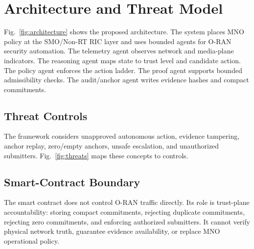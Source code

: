 \section{Architecture and Threat Model}
Fig.~\ref{fig:architecture} shows the proposed architecture. The system places MNO policy at the SMO/Non-RT RIC layer and uses bounded agents for O-RAN security automation. The telemetry agent observes network and media-plane indicators. The reasoning agent maps state to trust level and candidate action. The policy agent enforces the action ladder. The proof agent supports bounded admissibility checks. The audit/anchor agent writes evidence hashes and compact commitments.




\subsection{Threat Controls}
The framework considers unapproved autonomous action, evidence tampering, anchor replay, zero/empty anchors, unsafe escalation, and unauthorized submitters. Fig.~\ref{fig:threats} maps these concepts to controls.



\subsection{Smart-Contract Boundary}
The smart contract does not control O-RAN traffic directly. Its role is trust-plane accountability: storing compact commitments, rejecting duplicate commitments, rejecting zero commitments, and enforcing authorized submitters. It cannot verify physical network truth, guarantee evidence availability, or replace MNO operational policy.
